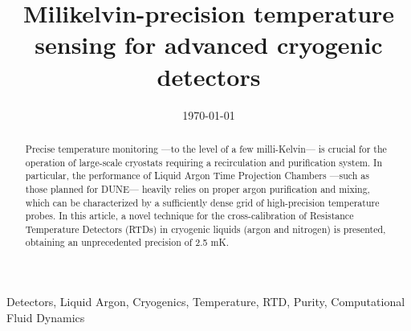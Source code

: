 \documentclass[review,1p,number,sort&compress]{elsarticle}
\begin{document}
\title{Milikelvin-precision temperature sensing for advanced cryogenic detectors}


\date{\today}

\begin{abstract}
Precise temperature monitoring  ---to the level of a few milli-Kelvin--- is crucial for the operation of large-scale cryostats requiring a recirculation and purification system. In particular, the performance of Liquid Argon Time Projection Chambers ---such as those planned for DUNE--- heavily relies on proper argon purification and mixing, which can be characterized by a sufficiently dense grid of high-precision temperature probes. In this article, a novel technique for the cross-calibration of Resistance Temperature Detectors (RTDs) in cryogenic liquids (argon and nitrogen) is presented, obtaining an unprecedented precision of 2.5 mK.
\end{abstract}

\begin{keyword}
Detectors, Liquid Argon, Cryogenics, Temperature, RTD, Purity, Computational Fluid Dynamics
\end{keyword}

\maketitle











\end{document}
